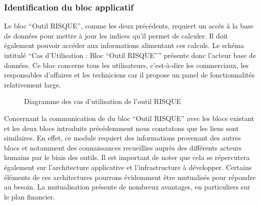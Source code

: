 \subsubsection{Identification du bloc applicatif}

Le bloc “Outil RISQUE”, comme les deux précédents, requiert un accès à la base de données pour mettre à jour les indices qu’il permet de calculer. Il doit également pouvoir accéder aux informations alimentant ces calculs. Le schéma intitulé “Cas d’Utilisation : Bloc “Outil RISQUE”” présente donc l’acteur base de données. Ce bloc concerne tous les utilisateurs, c’est-à-dire les commerciaux, les responsables d’affaires et les techniciens car il propose un panel de fonctionnalités relativement large.

\begin{figure}[H]
    \label{fig-uc-risque}
    \noindent{}
    \caption{Diagramme des cas d'utilisation de l'outil RISQUE}
\end{figure}

Concernant la communication de du bloc “Outil RISQUE” avec les blocs existant et les deux blocs introduits précédemment nous constatons que les liens sont similaires. En effet, ce module requiert des informations provenant des autres blocs et notamment des connaissances recueillies auprès des différents acteurs humains par le biais des outils. Il est important de noter que cela se répercutera également sur l’architecture applicative et l’infrastructure à développer. Certains éléments de ces architectures pourrons évidemment être mutualisés pour répondre au besoin. La mutualisation présente de nombreux avantages, en particuliers sur le plan financier.

